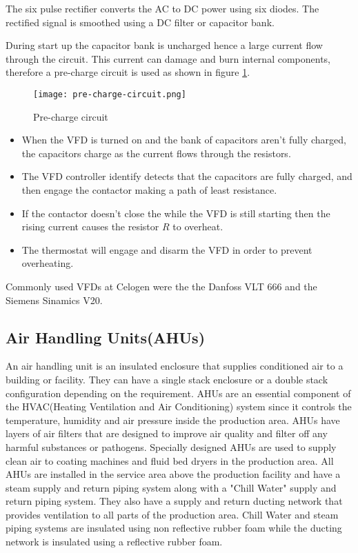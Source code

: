 \documentclass[a4paper,12pt]{article}
\begin{document}
						The six pulse rectifier converts the AC to DC power using six diodes. The rectified signal is smoothed using a DC filter or capacitor bank.
						
					During start up the capacitor bank is uncharged hence a large current flow through the circuit.
					This current can damage and burn internal components, therefore a pre-charge circuit is used as shown in figure \ref{fig:vfd-pre-charge-circuit}.
					
					\begin{figure}[H]
					\centering
						\texttt{[image: pre-charge-circuit.png]}
						\caption{Pre-charge circuit}
						\label{fig:vfd-pre-charge-circuit}
					\end{figure}
					
					\begin{itemize}
						\item When the VFD is turned on  and the bank of capacitors aren't fully charged, the capacitors charge as the current flows through the resistors.
						\item The VFD controller identify detects that the capacitors are fully charged, and then engage the contactor making a path of least resistance.
						\item If the contactor doesn't close the while the VFD is still starting then the rising current causes the resistor $R$ to overheat.
						\item The thermostat will engage and disarm the VFD in order to prevent overheating. 
					\end{itemize}
					
					Commonly used VFDs at Celogen were the the Danfoss VLT 666 and the Siemens Sinamics V20.
										
												
		\subsection{Air Handling Units(AHUs)}
		An air handling unit is an insulated enclosure that supplies conditioned air to a building or facility. They can have a single stack enclosure or a double stack configuration depending on the requirement.
		AHUs are an essential component of the HVAC(Heating Ventilation and Air Conditioning) system since it controls the temperature, humidity and air pressure inside the production area. AHUs have layers of air filters that are designed to improve air quality and filter off any harmful substances or pathogens. Specially designed AHUs are used to supply clean air to coating machines and fluid bed dryers in the production area.
		All AHUs are installed in the service area above the production facility and have a steam supply and return piping system along with a "Chill Water" supply and return piping system.
		They also have a supply and return ducting network that provides ventilation to all parts of the production area.
		Chill Water and steam piping systems are insulated using non reflective rubber foam while the ducting network is insulated using a reflective rubber foam.
		
\end{document}
